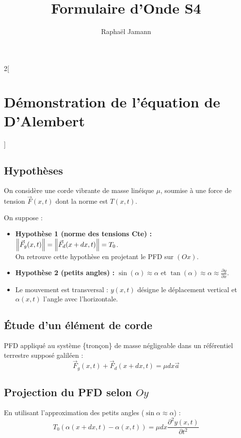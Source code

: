 \documentclass[a4paper,12pt]{article}
\title{Formulaire d'Onde S4}
\author{Raphaël Jamann}
\date{}
\begin{document}
    \maketitle

    \begin{multicols}{2}[
    \section*{Démonstration de l'équation de D'Alembert}
    ]
        
        \subsection*{Hypothèses}

            On considère une corde vibrante de masse linéique $\mu$, soumise à une force de tension $\vec F(x, t)$ dont la norme est $T(x, t)$.

            On suppose :
            \begin{itemize}
                \item \textbf{Hypothèse 1 (norme des tensions Cte) :} $\norm{\vec F_g(x,t)} = \norm{\vec F_d(x+dx,t)} = T_0$. \\
                        On retrouve cette hypothèse en projetant le PFD sur $(Ox)$.
                \item \textbf{Hypothèse 2 (petits angles) :} $\sin(\alpha) \approx \alpha$ et $\tan(\alpha) \approx \alpha \approx \frac{\partial y}{\partial x}$.
                \item Le mouvement est transversal : $y(x,t)$ désigne le déplacement vertical et $\alpha(x,t)$ l'angle avec l'horizontale.
            \end{itemize}

        \subsection*{Étude d'un élément de corde}

            PFD appliqué au système \{tronçon\} de masse négligeable dans un référentiel terrestre supposé galiléen :
            $$ \vec F_g(x,t) + \vec F_d(x + dx,t) = \mu dx \vec a $$

        \subsection*{Projection du PFD selon $Oy$}

            En utilisant l'approximation des petits angles ($\sin\alpha \approx \alpha$) :
            $$ T_0(\alpha(x+dx, t)-\alpha(x, t)) = \mu dx \frac{\partial^2 y(x, t)}{\partial t^2} $$


\end{multicols}
\end{document}
